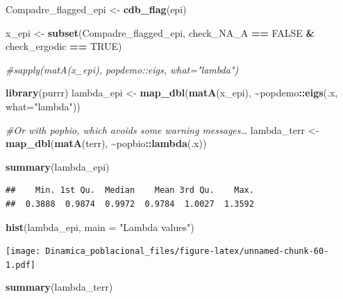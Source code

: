 \documentclass[
]{book}
\newenvironment{Shaded}{\begin{snugshade}}{\end{snugshade}}
\newcommand{\AttributeTok}[1]{\textcolor[rgb]{0.13,0.29,0.53}{#1}}
\newcommand{\CommentTok}[1]{\textcolor[rgb]{0.56,0.35,0.01}{\textit{#1}}}
\newcommand{\ConstantTok}[1]{\textcolor[rgb]{0.56,0.35,0.01}{#1}}
\newcommand{\FunctionTok}[1]{\textcolor[rgb]{0.13,0.29,0.53}{\textbf{#1}}}
\newcommand{\NormalTok}[1]{#1}
\newcommand{\OtherTok}[1]{\textcolor[rgb]{0.56,0.35,0.01}{#1}}
\newcommand{\SpecialCharTok}[1]{\textcolor[rgb]{0.81,0.36,0.00}{\textbf{#1}}}
\newcommand{\StringTok}[1]{\textcolor[rgb]{0.31,0.60,0.02}{#1}}
\theoremstyle{definition}
\theoremstyle{definition}
\theoremstyle{definition}
\theoremstyle{definition}
\theoremstyle{remark}
\begin{document}
\begin{Shaded}
\begin{Highlighting}[]
\NormalTok{Compadre\_flagged\_epi }\OtherTok{\textless{}{-}} \FunctionTok{cdb\_flag}\NormalTok{(epi)}

\NormalTok{x\_epi }\OtherTok{\textless{}{-}} \FunctionTok{subset}\NormalTok{(Compadre\_flagged\_epi, check\_NA\_A }\SpecialCharTok{==} \ConstantTok{FALSE} \SpecialCharTok{\&}\NormalTok{ check\_ergodic }\SpecialCharTok{==} \ConstantTok{TRUE}\NormalTok{)}

\CommentTok{\#sapply(matA(x\_epi), popdemo::eigs, what="lambda")}

\FunctionTok{library}\NormalTok{(purrr)}
\NormalTok{lambda\_epi }\OtherTok{\textless{}{-}} \FunctionTok{map\_dbl}\NormalTok{(}\FunctionTok{matA}\NormalTok{(x\_epi), }\SpecialCharTok{\textasciitilde{}}\NormalTok{popdemo}\SpecialCharTok{::}\FunctionTok{eigs}\NormalTok{(.x, }\AttributeTok{what=}\StringTok{"lambda"}\NormalTok{))}

\CommentTok{\#Or with popbio, which avoids some warning messages…}
\NormalTok{lambda\_terr }\OtherTok{\textless{}{-}} \FunctionTok{map\_dbl}\NormalTok{(}\FunctionTok{matA}\NormalTok{(terr), }\SpecialCharTok{\textasciitilde{}}\NormalTok{popbio}\SpecialCharTok{::}\FunctionTok{lambda}\NormalTok{(.x))}
\end{Highlighting}
\end{Shaded}

\begin{Shaded}
\begin{Highlighting}[]
\FunctionTok{summary}\NormalTok{(lambda\_epi)}
\end{Highlighting}
\end{Shaded}

\begin{verbatim}
##    Min. 1st Qu.  Median    Mean 3rd Qu.    Max. 
##  0.3888  0.9874  0.9972  0.9784  1.0027  1.3592
\end{verbatim}

\begin{Shaded}
\begin{Highlighting}[]
\FunctionTok{hist}\NormalTok{(lambda\_epi, }\AttributeTok{main =} \StringTok{"Lambda values"}\NormalTok{)}
\end{Highlighting}
\end{Shaded}

\texttt{[image: Dinamica\_poblacional\_files/figure-latex/unnamed-chunk-60-1.pdf]}

\begin{Shaded}
\begin{Highlighting}[]
\FunctionTok{summary}\NormalTok{(lambda\_terr)}
\end{Highlighting}
\end{Shaded}
\end{document}
